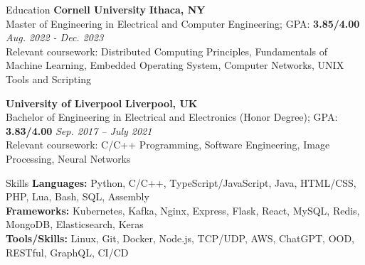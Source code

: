 \documentclass{resume} %
\begin{document}
\begin{rSection}{Education}
{\textbf{Cornell University}} \hfill{\textbf{Ithaca, NY}}
\\ Master of Engineering in Electrical and Computer Engineering; GPA: \textbf{3.85/4.00} \hfill{\em Aug. 2022 - Dec. 2023}
\\ Relevant coursework: Distributed Computing Principles, Fundamentals of Machine Learning, Embedded Operating System, Computer Networks, UNIX Tools and Scripting

{\textbf{University of Liverpool}} \hfill{\textbf{Liverpool, UK}}
\\ Bachelor of Engineering in Electrical and Electronics (Honor Degree); GPA: \textbf{3.83/4.00} \hfill{\em Sep. 2017 -- July 2021}
\\ Relevant coursework: C/C++ Programming, Software Engineering, Image Processing, Neural Networks
\end{rSection}

\begin{rSection}{Skills}
{\textbf{Languages:}} Python, C/C++, TypeScript/JavaScript, Java, HTML/CSS, PHP, Lua, Bash, SQL, Assembly
\\{\textbf{Frameworks:}} Kubernetes, Kafka, Nginx, Express, Flask, React, MySQL, Redis, MongoDB, Elasticsearch, Keras
\\{\textbf{Tools/Skills:}} Linux, Git, Docker, Node.js, TCP/UDP, AWS, ChatGPT, OOD, RESTful, GraphQL, CI/CD

\end{rSection}
\end{document}
